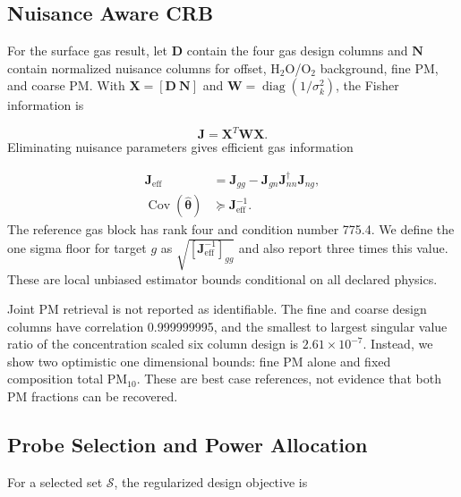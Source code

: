 \documentclass[conference]{IEEEtran}
\newcommand{\pmten}{PM$_{10}$}
\begin{document}
\subsection{Nuisance Aware CRB}

For the surface gas result, let $\boldsymbol D$ contain the four gas design columns and $\boldsymbol N$ contain normalized nuisance columns for offset, H$_2$O/O$_2$ background, fine PM, and coarse PM. With $\boldsymbol X=[\boldsymbol D\ \boldsymbol N]$ and $\boldsymbol W=\operatorname{diag}(1/\sigma_k^2)$, the Fisher information is \cite{kay1993}

\begin{equation}
\boldsymbol J=\boldsymbol X^T\boldsymbol W\boldsymbol X.
\label{eq:fim}
\end{equation}
Eliminating nuisance parameters gives efficient gas information

\begin{equation}
\begin{aligned}
\boldsymbol J_{\mathrm{eff}}&=\boldsymbol J_{gg}
-\boldsymbol J_{gn}\boldsymbol J_{nn}^{\dagger}\boldsymbol J_{ng},\\
\operatorname{Cov}(\widehat{\boldsymbol\theta})&\succeq
\boldsymbol J_{\mathrm{eff}}^{-1}.
\end{aligned}
\label{eq:schur}
\end{equation}
The reference gas block has rank four and condition number 775.4. We define the one sigma floor for target $g$ as $\sqrt{[\boldsymbol J_{\mathrm{eff}}^{-1}]_{gg}}$ and also report three times this value. These are local unbiased estimator bounds conditional on all declared physics.

Joint PM retrieval is not reported as identifiable. The fine and coarse design columns have correlation 0.999999995, and the smallest to largest singular value ratio of the concentration scaled six column design is $2.61\times10^{-7}$. Instead, we show two optimistic one dimensional bounds: fine PM alone and fixed composition total \pmten. These are best case references, not evidence that both PM fractions can be recovered.

\subsection{Probe Selection and Power Allocation}

For a selected set $\mathcal{S}$, the regularized design objective is \cite{atkinson2007}
\end{document}
